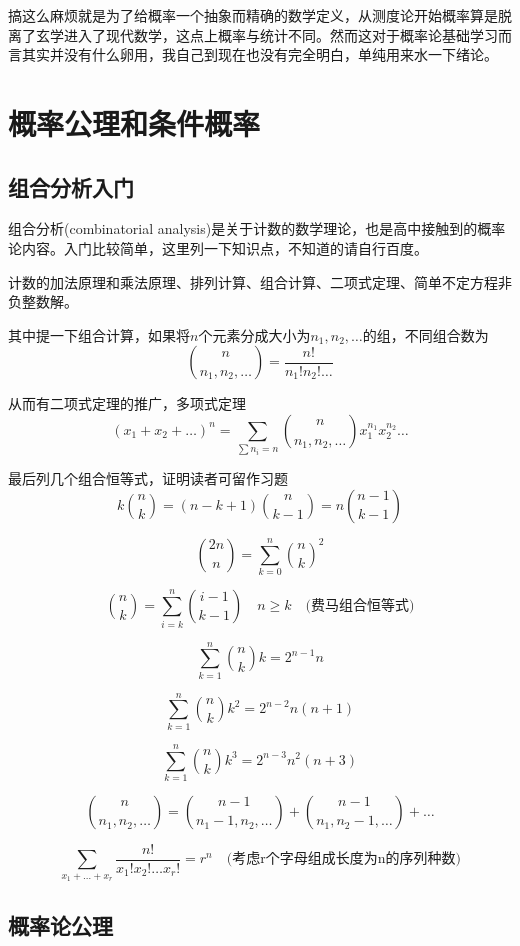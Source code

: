 \documentclass[UTF8]{ctexart}
\begin{document}
搞这么麻烦就是为了给概率一个抽象而精确的数学定义，从测度论开始概率算是脱离了玄学进入了现代数学，这点上概率与统计不同。然而这对于概率论基础学习而言其实并没有什么卵用，我自己到现在也没有完全明白，单纯用来水一下绪论。

\section{概率公理和条件概率}

\subsection{组合分析入门}

组合分析(combinatorial analysis)是关于计数的数学理论，也是高中接触到的概率论内容。入门比较简单，这里列一下知识点，不知道的请自行百度。

计数的加法原理和乘法原理、排列计算、组合计算、二项式定理、简单不定方程非负整数解。

其中提一下组合计算，如果将$n$个元素分成大小为$n_{1},n_{2},\ldots$的组，不同组合数为
$$\binom{n}{n_{1},n_{2},\ldots}=\frac{n!}{n_{1}!n_{2}!\ldots}$$

从而有二项式定理的推广，多项式定理
$$(x_{1} + x_{2} + \ldots )^{n}=\sum_{\sum n_{i}=n}\binom{n}{n_{1},n_{2},\ldots} x_{1}^{n_{1}}x_{2}^{n_{2}}\ldots $$

最后列几个组合恒等式，证明读者可留作习题
$$k\displaystyle\binom{n}{k}=(n-k+1)\binom{n}{k-1}=n\binom{n-1}{k-1}$$

$$\displaystyle\binom{2n}{n}=\sum\limits_{k=0}^{n}\binom{n}{k}^{2}$$

$$\displaystyle\binom{n}{k}=\sum\limits_{i=k}^{n}\binom{i-1}{k-1}\quad n\geq k \quad \text{(费马组合恒等式)}$$

$$\displaystyle\sum\limits_{k=1}^{n}\binom{n}{k}k=2^{n-1}n$$

$$\displaystyle\sum\limits_{k=1}^{n}\binom{n}{k}k^{2}=2^{n-2}n(n+1)$$

$$\displaystyle\sum\limits_{k=1}^{n}\binom{n}{k}k^{3}=2^{n-3}n^{2}(n+3)$$

$$\displaystyle\binom{n}{n_{1},n_{2},\ldots}=\binom{n-1}{n_{1}-1,n_{2},\ldots}+\binom{n-1}{n_{1},n_{2}-1,\ldots}+\ldots $$

$$\displaystyle\sum\limits_{x_{1}+\ldots+x_{r}}\frac{n!}{x_{1}!x_{2}!\ldots x_{r}!}=r^{n}\quad \text{(考虑r个字母组成长度为n的序列种数)}$$

\subsection{概率论公理}
\end{document}
